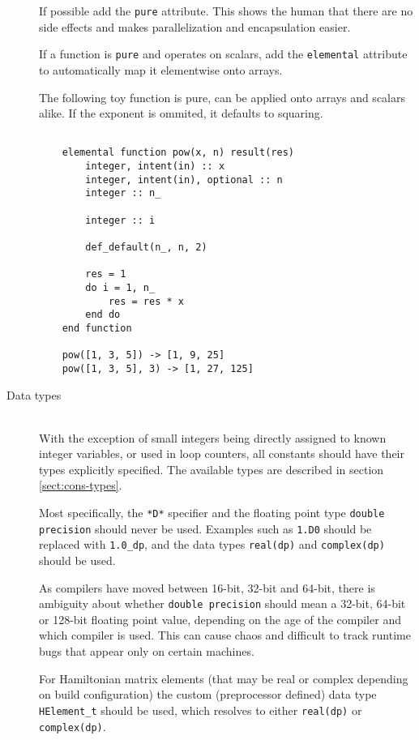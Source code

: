 \documentclass[a4paper,notitlepage,dvipsnames]{scrreprt}
\newcommand\headitem[1]{\needspace{1.5\baselineskip}\item[{\boldmath #1 \nopagebreak}] \hfill \\ \nopagebreak}
\let\code\lstinline
\begin{document}
\begin{description}
    If possible add the \code{pure} attribute.
    This shows the human that there are no side effects and makes
    parallelization and encapsulation easier.

    If a function is \code{pure} and operates on scalars, add
    the \code{elemental} attribute to automatically map it elementwise
    onto arrays.

    The following toy function is pure, can be applied onto arrays
    and scalars alike.
    If the exponent is ommited, it defaults to squaring.

    \begin{lstlisting}

    elemental function pow(x, n) result(res)
        integer, intent(in) :: x
        integer, intent(in), optional :: n
        integer :: n_

        integer :: i

        def_default(n_, n, 2)

        res = 1
        do i = 1, n_
            res = res * x
        end do
    end function

    pow([1, 3, 5]) -> [1, 9, 25]
    pow([1, 3, 5], 3) -> [1, 27, 125]

    \end{lstlisting}

	\headitem{Data types}
		With the exception of small integers being directly assigned to known
		integer variables, or used in loop counters, all constants should have
		their types explicitly specified. The available types are described
		in section \ref{sect:cons-types}.

		Most specifically, the \code{*D*} specifier and the floating
		point type \code{double precision} should never be used. Examples
		such as \code{1.D0} should be replaced with \code{1.0_dp},
		and the data types \code{real(dp)} and \code{complex(dp)}
		should be used.

		As compilers have moved between 16-bit, 32-bit and 64-bit, there is
		ambiguity about whether \code{double precision} should mean a
		32-bit, 64-bit or 128-bit floating point value, depending on the age
		of the compiler and which compiler is used. This can cause chaos and
		difficult to track runtime bugs that appear only on certain machines.

		For Hamiltonian matrix elements (that may be real or complex depending
		on build configuration) the custom (preprocessor defined) data type
		\code{HElement_t} should be used, which resolves to either
		\code{real(dp)} or \code{complex(dp)}.



\end{description}
\end{document}
